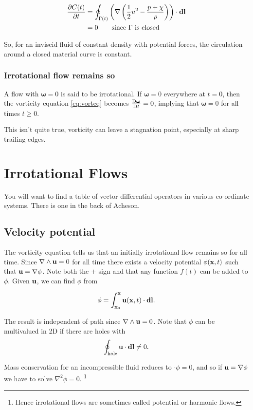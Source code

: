 \documentclass{notes}
\newcommand{\matd}[1]{\DDt{#1}}
\newcommand{\bso}{\boldsymbol\omega}
\newcommand{\grad}{\nabla}
\newcommand{\curl}{\nabla\wedge}
\newcommand{\lapl}{\nabla^2}
\begin{document}
\begin{align*}
  \pd{C(t)}{t} &= \oint_{\Gamma(t)}
  \left(\grad \left(\frac{1}{2}u^2 -  \frac{p+\chi}{\rho} \right) \right)
  \cdot\vect{dl} \\
  &=0 \qquad \text{since $\Gamma$ is closed}
\end{align*}

So, for an inviscid fluid of constant density with potential forces,
the circulation around a closed material curve is constant.

\subsection{Irrotational flow remains so}

A flow with $\bso = 0$ is said to be irrotational.  If $\bso=0$
everywhere at $t=0$, then the vorticity equation \eqref{eq:vorteq}
becomes $\matd{\bso} = 0$, implying that $\bso=0$ for all times $t \ge
0$.

This isn't quite true, vorticity can leave a stagnation point,
especially at sharp trailing edges.

\chapter{Irrotational Flows}

You will want to find a table of vector differential operators in
various co-ordinate systems.  There is one in the back of
Acheson.

\section{Velocity potential}

The vorticity equation tells us that an initially irrotational flow
remains so for all time.  Since $\curl\vu = 0$ for all time there
exists a velocity potential $\phi(\mathbf{x},t)$ such that $\vu = \grad\phi$.
Note both the $+$ sign and that any function $f(t)$ can be added to
$\phi$.  Given $\mathbf{u}$, we can find $\phi$ from

\[
\phi = \int_{\mathbf{x}_0}^{\mathbf{x}} \mathbf{u}(\mathbf{x},t)\cdot\mathbf{dl}.
\]

The result is independent of path since $\curl\vu = 0$.  Note that
$\phi$ can be multivalued in 2D if there are holes with
\[
\oint_{\text{hole}} \mathbf{u} \cdot \mathbf{dl} \neq 0.
\]

Mass conservation for an incompressible fluid reduces to $\cdot\phi =
0$, and so if $\vu = \grad\phi$ we have to solve $\lapl\phi = 0$.%
\footnote{Hence irrotational flows are sometimes called potential or
  harmonic flows.}
\end{document}
